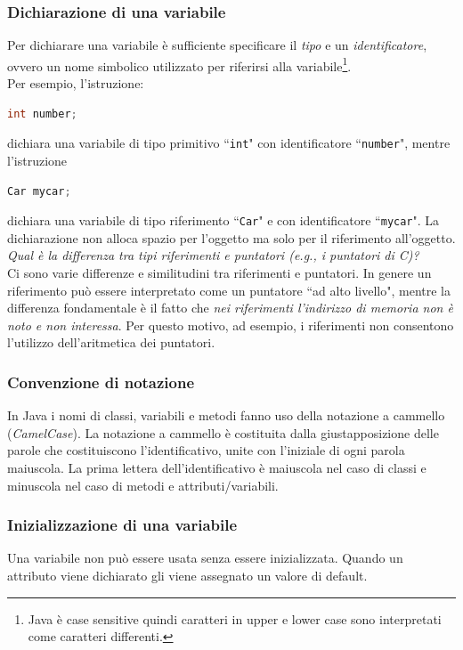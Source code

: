 \documentclass{article}
\theoremstyle{definition}
\begin{document}
\subsubsection{Dichiarazione di una variabile}
Per dichiarare una variabile \`e sufficiente specificare il \emph{tipo} e un \emph{identificatore}, ovvero un nome simbolico utilizzato per riferirsi alla variabile\footnote{Java \`e case sensitive quindi caratteri in upper e lower case sono interpretati come caratteri differenti.}. \\
Per esempio, l'istruzione:
\begin{lstlisting}[language=Java,escapechar=|]
int number;
\end{lstlisting}
dichiara una variabile di tipo primitivo ``\texttt{int}" con identificatore ``\texttt{number}", mentre l'istruzione
\begin{lstlisting}[language=Java,escapechar=|]
Car mycar;
\end{lstlisting}
dichiara una variabile di tipo riferimento ``\texttt{Car}" e con identificatore ``\texttt{mycar}".
La dichiarazione non alloca spazio per l'oggetto ma solo per il riferimento all'oggetto. \\

\emph{Qual \`e la differenza tra tipi riferimenti e puntatori (e.g., i puntatori di C)?}\\
Ci sono varie differenze e similitudini tra riferimenti e puntatori. In genere un riferimento pu\`o essere interpretato come un puntatore ``ad alto livello", mentre la differenza fondamentale \`e  il fatto che \emph{nei riferimenti l'indirizzo di memoria non \`e noto e non interessa}. Per questo motivo, ad esempio, i riferimenti non consentono l'utilizzo dell'aritmetica dei puntatori. 


\subsubsection{Convenzione di notazione}
In Java i nomi di classi, variabili e metodi fanno uso della notazione a cammello (\emph{CamelCase}).
La notazione a cammello \`e costituita dalla giustapposizione delle parole che costituiscono l'identificativo, unite con l'iniziale di ogni parola maiuscola. 
La prima lettera dell'identificativo è maiuscola nel caso di classi e minuscola nel caso di metodi e attributi/variabili. 

\subsubsection{Inizializzazione di una variabile}
Una variabile non pu\`o essere usata senza essere inizializzata. Quando un attributo viene dichiarato gli viene assegnato un valore di default.
\end{document}
